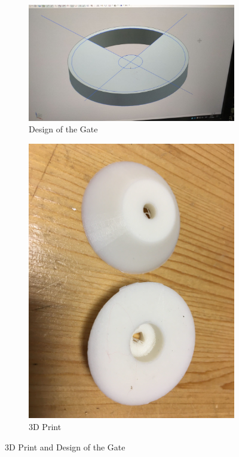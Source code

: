 \begin{figure}[h]
     \centering
     \begin{subfigure}[b]{0.49\linewidth}
     \includegraphics[width=\linewidth]{content/cylinder.jpeg}
     \caption{Design of the Gate}
     \label{fig:cylinder}
     \end{subfigure}
     \begin{subfigure}[b]{0.49\linewidth}
     \includegraphics[width=\linewidth]{content/3dprint.jpg}
     \caption {3D Print}
     \label{fig:3dprint}
     \end{subfigure}
     \caption{3D Print and Design of the Gate}
     \label{fig:cylinder3d}
\end{figure}

